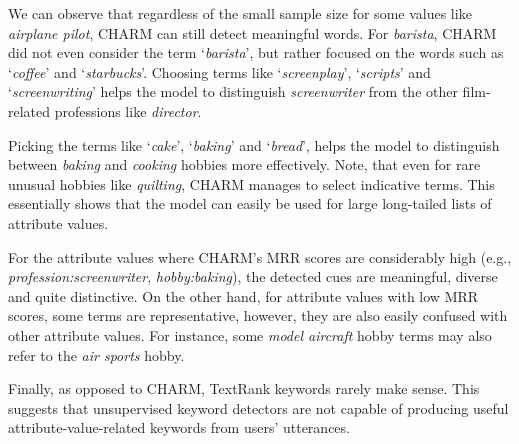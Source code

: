 We can observe that regardless of the small sample size for some values like \textit{airplane pilot}, CHARM can still detect meaningful words. For \textit{barista}, CHARM did not even consider the term `\textit{barista}', but rather focused on the words such as `\textit{coffee}' and `\textit{starbucks}'. 
Choosing terms like `\textit{screenplay}', `\textit{scripts}' and `\textit{screenwriting}' helps the model to distinguish \textit{screenwriter} from the other film-related professions like \emph{director}.

Picking the terms like `\textit{cake}', `\textit{baking}' and `\textit{bread}', helps the model to distinguish between \textit{baking} and \textit{cooking} hobbies more effectively.
Note, that even for rare unusual hobbies like \textit{quilting}, CHARM manages to select indicative terms. This essentially shows that the model can easily be used for large long-tailed lists of attribute values.

For the attribute values where CHARM's MRR scores are considerably high (e.g., \emph{profession:screenwriter}, \emph{hobby:baking}), the detected cues are meaningful, diverse and quite distinctive. 
On the other hand, for attribute values with low MRR scores, some terms are representative, however, they are also easily confused with other attribute values. For instance, some \emph{model aircraft} hobby terms  may also refer to the \emph{air sports} hobby.

Finally, as opposed to CHARM, TextRank keywords rarely make sense. This suggests that unsupervised keyword detectors are not capable of producing useful attribute-value-related keywords from users' utterances. 



